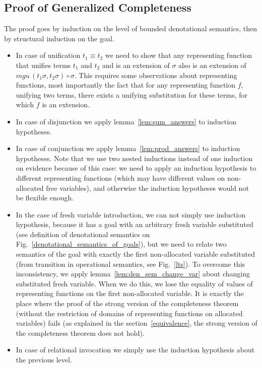 \subsection{Proof of Generalized Completeness}
\label{appendix_gen_completeness_proof}

The proof goes by induction on the level of bounded denotational semantics, then by structural induction on the goal.

\begin{itemize}
\item In case of unification $t_1\equiv t_2$ we need to show that any representing function that unifies terms $t_1$ and $t_2$ and is an extension of $\sigma$ also is an extension of $mgu\,(t_1 \sigma, t_2 \sigma) \circ \sigma$. This requires some observations about representing functions, most importantly the fact that for any representing function $f$, unifying two terms, there exists a unifying substitution for these terms, for which $f$ is an extension.
\item In case of disjunction we apply lemma~\ref{lem:sum_answers} to induction hypotheses.
\item In case of conjunction we apply lemma~\ref{lem:prod_answers} to induction hypotheses. Note that we use two nested inductions instead of one induction on evidence because of this case: we need to apply an induction hypothesis to different representing functions (which may have different values on non-allocated free variables), and otherwise the induction hypotheses would not be flexible enough.
\item In the case of fresh variable introduction, we can not simply use induction hypothesis, because it has a goal with an arbitrary fresh variable substituted (see definition of denotational semantics on Fig.~\ref{denotational_semantics_of_goals}), but we need to relate two semantics of the goal with exactly the first non-allocated variable substituted (from transition in operational semantics, see Fig.~\ref{lts}). To overcome this inconsistency, we apply lemma~\ref{lem:den_sem_change_var} about changing substituted fresh variable. When we do this, we lose the equality of values of representing functions on the first non-allocated variable. It is exactly the place where the proof of the strong version of the completeness theorem (without the restriction of domains of representing functions on allocated variables) fails (as explained in the section~\ref{equivalence}, the strong version of the completeness theorem does not hold).
\item In case of relational invocation we simply use the induction hypothesis about the previous level.
\end{itemize}

